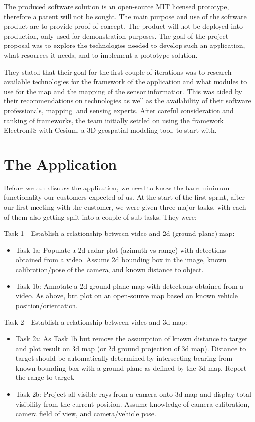 \documentclass{l3proj}
\begin{document}
The produced software solution is an open-source MIT licensed prototype, therefore a patent will not be sought. The main purpose and use of the software product are to provide proof of concept. The product will not be deployed into production, only used for demonstration purposes. The goal of the project proposal was to explore the technologies needed to develop such an application, what resources it needs, and to implement a prototype solution.

They stated that their goal for the first couple of iterations was to research available technologies for the framework of the application and what modules to use for the map and the mapping of the sensor information. This was aided by their recommendations on technologies as well as the availability of their software professionals, mapping, and sensing experts. After careful consideration and ranking of frameworks, the team initially settled on using the framework ElectronJS with Cesium, a 3D geospatial modeling tool, to start with.

\section{The Application}

Before we can discuss the application, we need to know the bare minimum functionality our customers expected of us. At the start of the first sprint, after our first meeting with the customer, we were given three major tasks, with each of them also getting split into a couple of sub-tasks. They were:

Task 1 - Establish a relationship between video and 2d (ground plane) map:
\begin{itemize}
	\item Task 1a: Populate a 2d radar plot (azimuth vs range) with detections obtained from a video. Assume 2d bounding box in the image, known calibration/pose of the camera, and known distance to object.  
	\item Task 1b: Annotate a 2d ground plane map with detections obtained from a video. As above, but plot on an open-source map based on known vehicle position/orientation. 
\end{itemize}

Task 2 - Establish a relationship between video and 3d map:
\begin{itemize}
	\item Task 2a: As Task 1b but remove the assumption of known distance to target and plot result on 3d map (or 2d ground projection of 3d map). Distance to target should be automatically determined by intersecting bearing from known bounding box with a ground plane as defined by the 3d map. Report the range to target.
	\item Task 2b: Project all visible rays from a camera onto 3d map and display total visibility from the current position. Assume knowledge of camera calibration, camera field of view, and camera/vehicle pose. 
\end{itemize}
\end{document}
